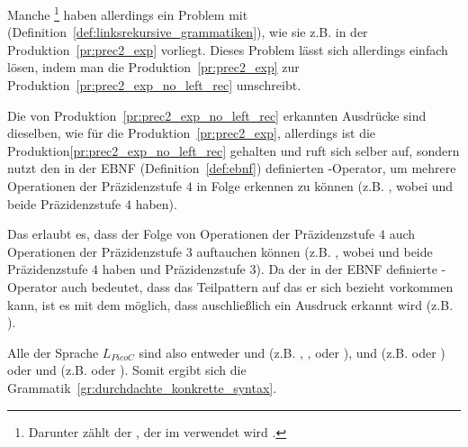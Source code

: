 \begin{grammar}
\end{grammar}

\begin{Special_Paragraph}
  Manche \footnote{Darunter zählt der , der im  verwendet wird .} haben allerdings ein Problem mit  (Definition~\ref{def:linksrekursive_grammatiken}), wie sie z.B. in der Produktion~\ref{pr:prec2_exp} vorliegt. Dieses Problem lässt sich allerdings einfach lösen, indem man die Produktion~\ref{pr:prec2_exp} zur Produktion~\ref{pr:prec2_exp_no_left_rec} umschreibt.

\begin{grammar}
\end{grammar}

Die von Produktion~\ref{pr:prec2_exp_no_left_rec} erkannten Ausdrücke sind dieselben, wie für die Produktion~\ref{pr:prec2_exp}, allerdings ist die Produktion\ref{pr:prec2_exp_no_left_rec}  gehalten und ruft sich  selber auf, sondern nutzt den in der EBNF (Definition~\ref{def:ebnf}) definierten \smalltt{*}-Operator, um mehrere Operationen der Präzidenzstufe $4$ in Folge erkennen zu können (z.B. , wobei \smalltt{-} und \smalltt{+} beide Präzidenzstufe $4$ haben).

Das   erlaubt es, dass  der Folge von Operationen der Präzidenzstufe $4$ auch Operationen der Präzidenzstufe $3$ auftauchen können (z.B. , wobei \smalltt{-} und \smalltt{+} beide Präzidenzstufe $4$ haben und \smalltt{/} Präzidenzstufe $3$). Da der in der EBNF definierte \smalltt{*}-Operator auch bedeutet, dass das Teilpattern auf das er sich bezieht  vorkommen kann, ist es mit dem   möglich, dass auschließlich ein Ausdruck  erkannt wird (z.B. ).
\end{Special_Paragraph}

Alle  der Sprache $L_{PicoC}$ sind also entweder  und  (z.B. , ,  oder ),  und  (z.B.  oder ) oder  und  (z.B.  oder ). Somit ergibt sich die Grammatik~\ref{gr:durchdachte_konkrette_syntax}.

